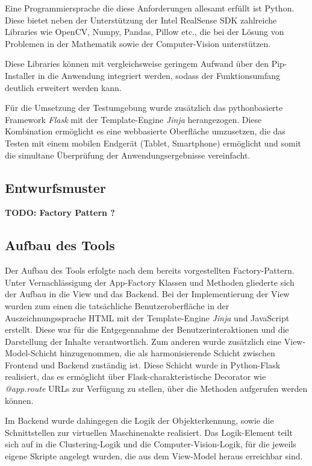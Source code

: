 \documentclass[
    type=Projektarbeit,
    status=draft, %
    language=german, %
    bibengine=bibtex,
]{unibwm-inf-thesis}
\newcommand{\todo}[1]{\textbf{TODO: #1}}
\begin{document}
    Eine Programmiersprache die diese Anforderungen allesamt erfüllt ist Python.
    Diese bietet neben der Unterstützung der Intel RealSense SDK zahlreiche Libraries wie OpenCV, Numpy, Pandas,
    Pillow etc., die bei der Lösung von Problemen in der Mathematik sowie der Computer-Vision unterstützen.

    Diese Libraries können mit vergleichsweise geringem Aufwand über den Pip-Installer in die Anwendung integriert
    werden, sodass der Funktionsumfang deutlich erweitert werden kann.

    Für die Umsetzung der Testumgebung wurde zusätzlich das pythonbasierte Framework \textit{Flask} mit der
    Template-Engine \textit{Jinja} herangezogen.
    Diese Kombination ermöglicht es eine webbasierte Oberfläche umzusetzen, die das Testen mit einem mobilen Endgerät
    (Tablet, Smartphone) ermöglicht und somit die simultane Überprüfung der Anwendungsergebnisse vereinfacht.

    \subsection{Entwurfsmuster}\label{subsec:entwurfsmuster}
    \todo{Factory Pattern ?}

    \subsection{Aufbau des Tools} \label{subsec:aufbau-des-tools}
    Der Aufbau des Tools erfolgte nach dem bereits vorgestellten Factory-Pattern. 
    Unter Vernachlässigung der App-Factory Klassen und Methoden gliederte sich der Aufbau in die View und das Backend.
    Bei der Implementierung der View wurden zum einen die tatsächliche Benutzeroberfläche in der Auszeichnungssprache
    HTML mit der Template-Engine \textit{Jinja} und JavaScript erstellt.
    Diese war für die Entgegennahme der Benutzerinteraktionen und die Darstellung der Inhalte verantwortlich.
    Zum anderen wurde zusätzlich eine View-Model-Schicht hinzugenommen, die als harmonisierende Schicht zwischen
    Frontend und Backend zuständig ist.
    Diese Schicht wurde in Python-Flask realisiert, das es ermöglicht über Flask-charakteristische Decorator wie
    \textit{@app.route} URLs zur Verfügung zu stellen, über die Methoden aufgerufen werden können.

    Im Backend wurde dahingegen die Logik der Objekterkennung, sowie die Schnittstellen zur virtuellen Maschinenakte realisiert.
    Das Logik-Element teilt sich auf in die Clustering-Logik und die Computer-Vision-Logik, für die jeweils eigene
    Skripte angelegt wurden, die aus dem View-Model heraus erreichbar sind.
\end{document}
